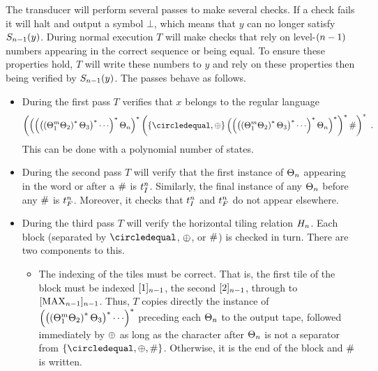 The transducer will perform several passes to make several checks.
If a check fails it will halt and output a symbol $\bot$, which means that $y$ can no longer satisfy
$\goodnums{\expheight-1}{y}$.
During normal execution $T$ will make checks that rely on level-$(\expheight-1)$ numbers appearing in the correct sequence or being equal.
To ensure these properties hold, $T$ will write these numbers to $y$ and rely on these properties then being verified by
$\goodnums{\expheight-1}{y}$.
The passes behave as follows.
\begin{itemize}
\item
    During the first pass $T$ verifies that $x$ belongs to the regular language
    \[
        \brac{
            \brac{
                \brac{
                    \brac{
                        \brac{\tilesnum{1}^\linlen \tilesnum{2}}^\ast \tilesnum{3}
                    }^\ast
                    \cdots
                }^\ast
                \tilesnum{\expheight}
            }^\ast
            \brac{
                \set{\numeq,\numplus}
                \brac{
                    \brac{
                        \brac{
                            \brac{\tilesnum{1}^\linlen \tilesnum{2}}^\ast \tilesnum{3}
                        }^\ast
                        \cdots
                    }^\ast
                    \tilesnum{\expheight}
                }^\ast
            }^\ast
            \numsep
         }^\ast
         \ .
    \]
    This can be done with a polynomial number of states.

\item
    During the second pass $T$ will verify that the first instance of
    $\tilesnum{\expheight}$
    appearing in the word or after a $\numsep$ is $\inittilenum{\expheight}$.
    Similarly, the final instance of any
    $\tilesnum{\expheight}$
    before any $\numsep$ is $\fintilenum{\expheight}$.
    Moreover, it checks that
    $\inittilenum{\expheight}$
    and
    $\fintilenum{\expheight}$
    do not appear elsewhere.

\item
    During the third pass $T$ will verify the horizontal tiling relation
    $\hrelnum{\expheight}$.
    Each block (separated by $\numeq$, $\numplus$, or $\numsep$) is checked in turn.
    There are two components to this.
    \begin{itemize}
    \item
        The indexing of the tiles must be correct.
        That is, the first tile of the block must be indexed
        $\tenc{\expheight-1}{1}$,
        the second
        $\tenc{\expheight-1}{2}$,
        through to
        $\tenc{\expheight-1}{\nmax{\expheight-1}}$.
        Thus, $T$ copies directly the instance of
        $\brac{
            \brac{
                \brac{\tilesnum{1}^\linlen \tilesnum{2}}^\ast \tilesnum{3}
            }^\ast
            \cdots
        }^\ast$
        preceding each
        $\tilesnum{\expheight}$
        to the output tape, followed immediately by
        $\numplus$
        as long as the character after
        $\tilesnum{\expheight}$
        is not a separator from
        $\set{\numeq,\numplus,\numsep}$.
        Otherwise, it is the end of the block and $\numsep$ is written.


\end{itemize}
\end{itemize}

